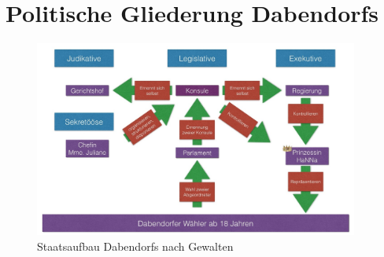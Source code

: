\section{{Politische Gliederung Dabendorfs}}
\begin{figure}[!h]
\centering
\includegraphics[width=0.95\textwidth]{bilder/gewaltenteilung.jpg}
\caption{Staatsaufbau Dabendorfs nach Gewalten}
\end{figure}
